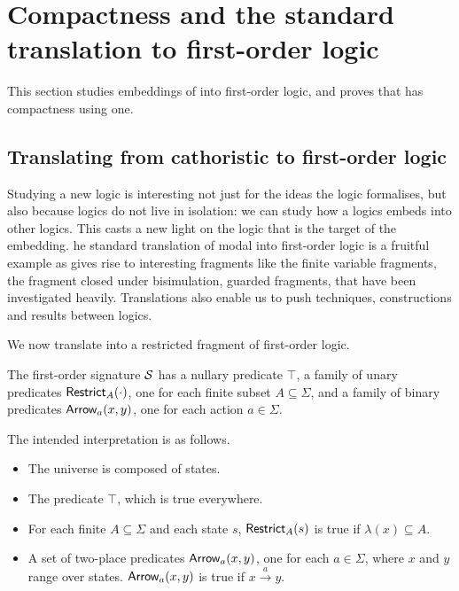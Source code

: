 \section{Compactness and the standard translation to first-order logic }
\label{compactness}

This section studies embeddings of \cathoristic{} into first-order
logic, and proves that \cathoristic{} has compactness using one.

\subsection{Translating from  cathoristic to
            first-order logic}\label{standardTranslation}

Studying a new logic is interesting not just for the ideas the logic
formalises, but also because logics do not live in isolation: we can
study how a logics embeds into other logics.  This casts a new light
on the logic that is the target of the embedding. he standard
translation of modal into first-order logic is a fruitful example as
gives rise to interesting fragments like the finite variable
fragments, the fragment closed under bisimulation, guarded fragments,
that have been investigated heavily. Translations also enable us to
push techniques, constructions and results between logics.

%

We now translate \cathoristic into a restricted fragment of
first-order logic.

\begin{definition}
The first-order signature $\mathcal{S}$ has a nullary predicate $\top$, a
family of unary predicates $\mathsf{Restrict}_{A}(\cdot)$, one for each finite
subset $A \subseteq \Sigma$, and a family of binary predicates
$\mathsf{Arrow}_{a}(x, y)$, one for each action $a \in \Sigma$. 

\end{definition}

\NI The intended interpretation is as follows.

\begin{itemize}

\item The universe is composed of states.

\item The predicate $\top$, which is true everywhere.

\item For each finite $A \subseteq \Sigma$ and each state $s$,  $\mathsf{Restrict}_{A}(s)$
is true if 
  $\lambda(x) \subseteq A$.

\item A set of two-place predicates $\mathsf{Arrow}_{a}(x, y)$, one for each $a
  \in \Sigma$, where $x$ and $y$ range over states. $\mathsf{Arrow}_{a}(x, y)$
  is true if $x \xrightarrow{a} y$.


\end{itemize}

